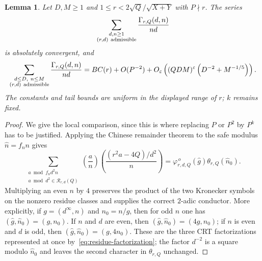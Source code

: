 \documentclass[12pt,reqno]{amsart}
\numberwithin{equation}{section}
\theoremstyle{plain}
\newtheorem{lemma}[theorem]{Lemma}
\theoremstyle{definition}
\theoremstyle{remark}
\begin{document}
\begin{lemma}\label{lem:local-arithmetic}
Let $D,M\geq1$ and $1\leq r<2\sqrt Q/\sqrt{X+Y}$ with $P\nmid r$.
The series
\[
\sum_{\substack{d,n\geq1\\ (r,d)\ {\rm admissible}}}
\frac{\Gamma_{r,Q}(d,n)}{nd}
\]
is absolutely convergent, and
\begin{equation}\label{eq:local-series}
\sum_{\substack{d\leq D,\ n\leq M\\ (r,d)\ {\rm admissible}}}
\frac{\Gamma_{r,Q}(d,n)}{nd}
=BC(r)+O(P^{-2})
+O_\varepsilon\left(
(QDM)^\varepsilon\left(D^{-2}+M^{-1/5}\right)
\right).
\end{equation}
The constants and tail bounds are uniform in the displayed range of $r$; $k$ remains fixed.
\end{lemma}

\begin{proof}
We give the local comparison, since this is where replacing $P$ or $P^2$ by $P^k$ has to be justified.
Applying the Chinese remainder theorem to the safe modulus $\widehat n=f_nn$ gives
\begin{equation}\label{eq:residue-factorization}
\sum_{\substack{a\bmod f_nd^2n\\
a\bmod d^2\in\mathcal R_{r,d}(Q)}}
\left(\frac a n\right)
\left(\frac{(r^2a-4Q)/d^2}{n}\right)
=
\varphi^{\,o}_{r,d,Q}(\widehat g)
\theta_{r,Q}(\widehat n_0).
\end{equation}
Multiplying an even $n$ by $4$ preserves the product of the two Kronecker symbols on the nonzero residue classes and supplies the correct $2$-adic conductor.
More explicitly, if $g=(d^\infty,n)$ and $n_0=n/g$, then for odd $n$ one has $(\widehat g,\widehat n_0)=(g,n_0)$.
If $n$ and $d$ are even, then
$(\widehat g,\widehat n_0)=(4g,n_0)$; if $n$ is even and $d$ is odd, then $(\widehat g,\widehat n_0)=(g,4n_0)$.
These are the three CRT factorizations represented at once by~\eqref{eq:residue-factorization}; the factor $d^{-2}$ is a square modulo $\widehat n_0$ and leaves the second character in $\theta_{r,Q}$ unchanged.


\end{proof}
\end{document}
